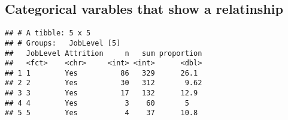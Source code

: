 \documentclass[
]{article}
\newenvironment{Shaded}{\begin{snugshade}}{\end{snugshade}}
\newcommand{\DataTypeTok}[1]{\textcolor[rgb]{0.13,0.29,0.53}{#1}}
\newcommand{\DecValTok}[1]{\textcolor[rgb]{0.00,0.00,0.81}{#1}}
\newcommand{\KeywordTok}[1]{\textcolor[rgb]{0.13,0.29,0.53}{\textbf{#1}}}
\newcommand{\NormalTok}[1]{#1}
\newcommand{\OperatorTok}[1]{\textcolor[rgb]{0.81,0.36,0.00}{\textbf{#1}}}
\newcommand{\StringTok}[1]{\textcolor[rgb]{0.31,0.60,0.02}{#1}}
\begin{document}
\hypertarget{categorical-varables-that-show-a-relatinship}{%
\subsection{Categorical varables that show a
relatinship}\label{categorical-varables-that-show-a-relatinship}}

\begin{Shaded}
\end{Shaded}

\begin{verbatim}
## # A tibble: 5 x 5
## # Groups:   JobLevel [5]
##   JobLevel Attrition     n   sum proportion
##   <fct>    <chr>     <int> <int>      <dbl>
## 1 1        Yes          86   329      26.1 
## 2 2        Yes          30   312       9.62
## 3 3        Yes          17   132      12.9 
## 4 4        Yes           3    60       5   
## 5 5        Yes           4    37      10.8
\end{verbatim}

\begin{Shaded}
\end{Shaded}
\end{document}
